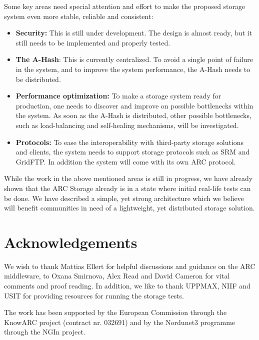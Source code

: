 \documentclass[final]{ieee}
\begin{document}
Some key areas need special attention and effort to make the proposed
storage system even more stable, reliable and consistent:
\begin{itemize}
\item \textbf{Security:} This is still under development. The design
  is almost ready, but it still needs to be implemented and properly
  tested.
\item \textbf{The A-Hash}: This is currently centralized. To avoid a single
  point of failure in the system, and to improve the system
  performance, the A-Hash needs to be distributed.
\item \textbf{Performance optimization:} To make a storage system
  ready for production, one needs to discover and improve on
  possible bottlenecks within the system. As soon as the A-Hash is
  distributed, other possible bottlenecks, such as load-balancing
  and self-healing mechanisms, will be investigated.
\item \textbf{Protocols:} To ease the interoperability with third-party
  storage solutions and clients, the system needs to support storage
  protocols such as SRM and GridFTP. In addition the system will come
  with its own ARC protocol.
\end{itemize}

While the work in the above mentioned areas is still in progress, we have 
already shown that the ARC Storage already is in a state where initial 
real-life tests can be done. We have described a simple, yet strong 
architecture which we believe will benefit communities in need of a lightweight, 
yet distributed storage solution.

\section{Acknowledgements}
\label{Acknowledgements}

We wish to thank Mattias Ellert for helpful discussions and guidance
on the ARC middleware, to Oxana Smirnova, Alex Read and David Cameron 
for vital comments and proof reading. In addition, we like to thank UPPMAX, NIIF and USIT for
providing resources for running the storage tests.

The work has been supported by the European Commission through the KnowARC
project (contract nr. 032691) and by the Nordunet3 programme through the NGIn
project.
\end{document}
